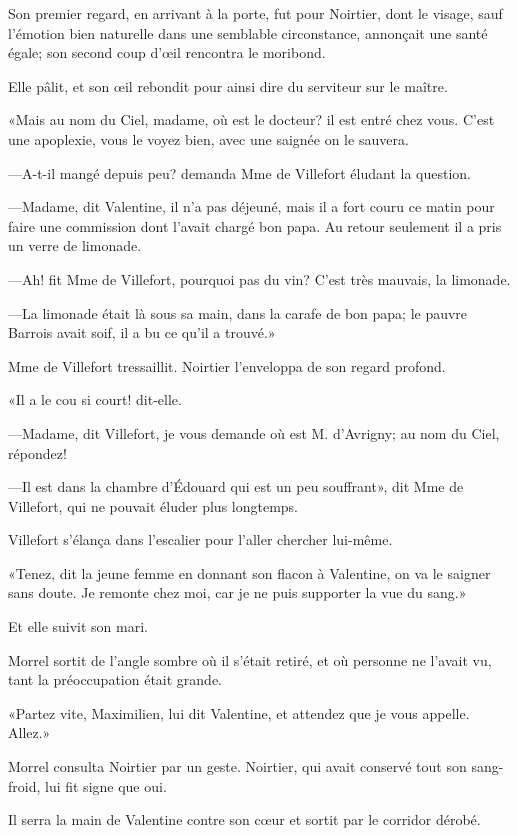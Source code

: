 Son premier regard, en arrivant à la porte, fut pour Noirtier, dont le visage, sauf l'émotion bien naturelle dans une semblable circonstance, annonçait une santé égale; son second coup d'œil rencontra le moribond. 

Elle pâlit, et son œil rebondit pour ainsi dire du serviteur sur le maître. 

«Mais au nom du Ciel, madame, où est le docteur? il est entré chez vous. C'est une apoplexie, vous le voyez bien, avec une saignée on le sauvera. 

—A-t-il mangé depuis peu? demanda Mme de Villefort éludant la question. 

—Madame, dit Valentine, il n'a pas déjeuné, mais il a fort couru ce matin pour faire une commission dont l'avait chargé bon papa. Au retour seulement il a pris un verre de limonade. 

—Ah! fit Mme de Villefort, pourquoi pas du vin? C'est très mauvais, la limonade. 

—La limonade était là sous sa main, dans la carafe de bon papa; le pauvre Barrois avait soif, il a bu ce qu'il a trouvé.» 

Mme de Villefort tressaillit. Noirtier l'enveloppa de son regard profond. 

«Il a le cou si court! dit-elle. 

—Madame, dit Villefort, je vous demande où est M. d'Avrigny; au nom du Ciel, répondez! 

—Il est dans la chambre d'Édouard qui est un peu souffrant», dit Mme de Villefort, qui ne pouvait éluder plus longtemps. 

Villefort s'élança dans l'escalier pour l'aller chercher lui-même. 

«Tenez, dit la jeune femme en donnant son flacon à Valentine, on va le saigner sans doute. Je remonte chez moi, car je ne puis supporter la vue du sang.» 

Et elle suivit son mari. 

Morrel sortit de l'angle sombre où il s'était retiré, et où personne ne l'avait vu, tant la préoccupation était grande. 

«Partez vite, Maximilien, lui dit Valentine, et attendez que je vous appelle. Allez.» 

Morrel consulta Noirtier par un geste. Noirtier, qui avait conservé tout son sang-froid, lui fit signe que oui. 

Il serra la main de Valentine contre son cœur et sortit par le corridor dérobé. 

